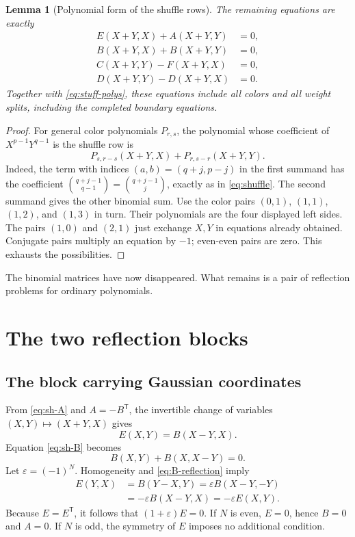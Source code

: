\documentclass[11pt,a4paper]{article}
\numberwithin{equation}{section}
\newtheorem{lemma}[theorem]{Lemma}
\theoremstyle{definition}\newtheorem{definition}[theorem]{Definition}
\theoremstyle{remark}\newtheorem{remark}[theorem]{Remark}
\newcommand{\rev}{\mathsf T}
\begin{document}
\begin{lemma}[Polynomial form of the shuffle rows]\label{lem:shuffle-polys}
The remaining equations are exactly
\begin{align}
E(X+Y,X)+A(X+Y,Y)&=0,\label{eq:sh-A}\\
B(X+Y,X)+B(X+Y,Y)&=0,\label{eq:sh-B}\\
C(X+Y,Y)-F(X+Y,X)&=0,\label{eq:sh-C}\\
D(X+Y,Y)-D(X+Y,X)&=0.\label{eq:sh-D}
\end{align}
Together with \eqref{eq:stuff-polys}, these equations include all colors and
all weight splits, including the completed boundary equations.
\end{lemma}
\begin{proof}
For general color polynomials $P_{r,s}$, the polynomial whose coefficient of
$X^{p-1}Y^{q-1}$ is the shuffle row is
\[
P_{s,r-s}(X+Y,X)+P_{r,s-r}(X+Y,Y).
\]
Indeed, the term with indices $(a,b)=(q+j,p-j)$ in the first summand has the
coefficient $\binom{q+j-1}{q-1}=\binom{q+j-1}{j}$, exactly as in
\eqref{eq:shuffle}. The second summand gives the other binomial sum.
Use the color pairs $(0,1)$, $(1,1)$, $(1,2)$, and $(1,3)$ in turn. Their
polynomials are the four displayed left sides. The pairs $(1,0)$ and $(2,1)$
just exchange $X,Y$ in equations already obtained. Conjugate pairs multiply
an equation by $-1$; even-even pairs are zero. This exhausts the possibilities.
\end{proof}

The binomial matrices have now disappeared. What remains is a pair of
reflection problems for ordinary polynomials.

\section{The two reflection blocks}
\label{sec:blocks}
\subsection{The block carrying Gaussian coordinates}
From \eqref{eq:sh-A} and $A=-B^\rev$, the invertible change of variables
$(X,Y)\mapsto(X+Y,X)$ gives
\begin{equation}
E(X,Y)=B(X-Y,X).
\label{eq:E-from-B}
\end{equation}
Equation \eqref{eq:sh-B} becomes
\begin{equation}
B(X,Y)+B(X,X-Y)=0.
\label{eq:B-reflection}
\end{equation}
Let $\varepsilon=(-1)^N$. Homogeneity and \eqref{eq:B-reflection} imply
\begin{align*}
E(Y,X)&=B(Y-X,Y)
 =\varepsilon B(X-Y,-Y)\\
&=-\varepsilon B(X-Y,X)=-\varepsilon E(X,Y).
\end{align*}
Because $E=E^\rev$, it follows that $(1+\varepsilon)E=0$.
If $N$ is even, $E=0$, hence $B=0$ and $A=0$. If $N$ is odd, the symmetry
of $E$ imposes no additional condition.
\end{document}

